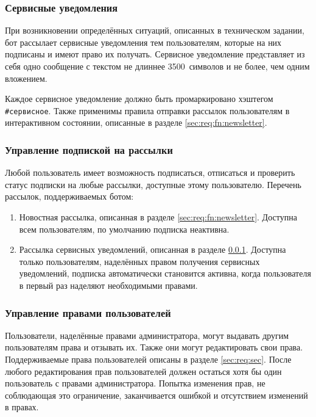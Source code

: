 \documentclass[12pt]{article}
\begin{document}
        \subsubsection{Сервисные уведомления}
            \label{sec:req:fn:service}
            При возникновении определённых ситуаций, описанных в техническом задании,
            бот рассылает сервисные уведомления тем пользователям, которые на них подписаны и имеют
            право их получать. Сервисное уведомление представляет из себя одно сообщение с текстом
            не длиннее 3500~символов и не более, чем одним вложением.

            Каждое сервисное уведомление должно быть промаркировано хэштегом \hbox{\texttt{\#сервисное}}.
            Также применимы правила отправки рассылок пользователям в интерактивном состоянии,
            описанные в разделе \ref{sec:req:fn:newsletter}.

        \subsubsection{Управление подпиской на рассылки}
            \label{sec:req:fn:subscriptions}
            Любой пользователь имеет возможность подписаться, отписаться и проверить статус подписки на
            любые рассылки, доступные этому пользователю. Перечень рассылок, поддерживаемых ботом:
            \begin{enumerate}
                \item
                    Новостная рассылка, описанная в разделе \ref{sec:req:fn:newsletter}.
                    Доступна всем пользователям, по умолчанию подписка неактивна.
                \item
                    Рассылка сервисных уведомлений, описанная в разделе \ref{sec:req:fn:service}.
                    Доступна только пользователям, наделённых правом получения сервисных уведомлений,
                    подписка автоматически становится активна, когда пользователя в первый
                    раз наделяют необходимыми правами.
            \end{enumerate}

        \subsubsection{Управление правами пользователей}
            \label{seq:req:fn:roles}
            Пользователи, наделённые правами администратора, могут выдавать другим
            пользователям права и отзывать их. Также они могут редактировать свои права.
            Поддерживаемые права пользователей описаны в разделе \ref{sec:req:sec}.
            После любого редактирования прав пользователей должен остаться хотя бы один
            пользователь с правами администратора. Попытка изменения прав, не соблюдающая
            это ограничение, заканчивается ошибкой и отсутствием изменений в правах.
\end{document}
